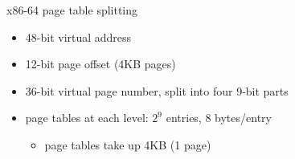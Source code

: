 
\begin{frame}{x86-64 page table splitting}
    \begin{itemize}
    \item 48-bit virtual address
    \item 12-bit page offset (4KB pages)
    \item 36-bit virtual page number, split into four 9-bit parts
    \item page tables at each level: $2^9$ entries, 8 bytes/entry
        \begin{itemize}
        \item page tables take up 4KB (1 page)
        \end{itemize}
    \end{itemize}
\end{frame}
